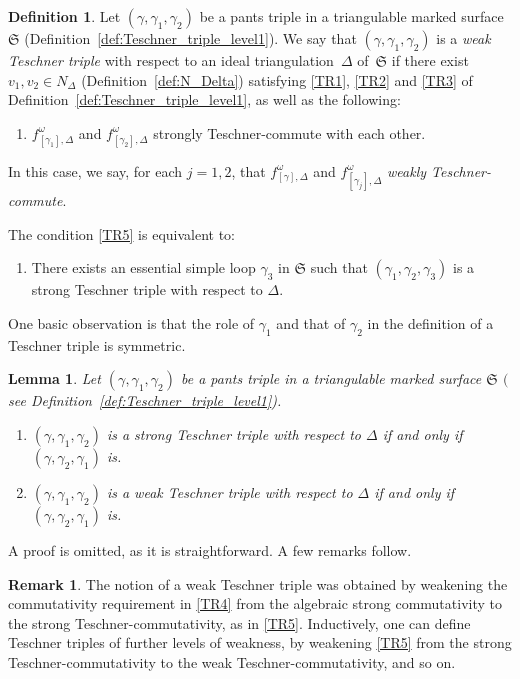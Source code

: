 \documentclass[pdftex]{sigma}
\numberwithin{equation}{section}
\newtheorem{Lemma}[Theorem]{Lemma}
\theoremstyle{definition}
\newtheorem{Definition}[Theorem]{Definition}
\newtheorem{Remark}[Theorem]{Remark}
\begin{document}
\begin{Definition}
\label{def:Teschner_triple_level2}
Let $(\gamma,\gamma_1,\gamma_2)$ be a pants triple in a triangulable marked surface $\mathfrak{S}$ (Definition~\ref{def:Teschner_triple_level1}). We say that $(\gamma,\gamma_1,\gamma_2)$ is a {\em weak Teschner triple} with respect to an ideal triangulation~$\Delta$ of~$\mathfrak{S}$ if there exist $v_1, v_2 \in N_\Delta$ (Definition~\ref{def:N_Delta}) satisfying \ref{TR1}, \ref{TR2} and \ref{TR3} of Definition~\ref{def:Teschner_triple_level1}, as well as the following:
\begin{enumerate}[label={\rm (TR\arabic*)}]\itemsep=0pt\setlength{\leftskip}{0.28cm}
\setcounter{enumi}{4}
\item\label{TR5} $f^\omega_{[\gamma_1],\Delta}$ and $f^\omega_{[\gamma_2],\Delta}$ strongly Teschner-commute with each other.
\end{enumerate}
In this case, we say, for each $j=1,2$, that $f^\omega_{[\gamma],\Delta}$ and $f^\omega_{[\gamma_j],\Delta}$ {\em weakly Teschner-commute}.
\end{Definition}
The condition \ref{TR5} is equivalent to:
\begin{enumerate}[label={\rm (TR\arabic*$'$)}]\itemsep=0pt\setlength{\leftskip}{0.38cm}
\setcounter{enumi}{4}
\item\label{TR5_prime} There exists an essential simple loop $\gamma_3$ in $\mathfrak{S}$ such that $(\gamma_1,\gamma_2,\gamma_3)$ is a strong Teschner triple with respect to $\Delta$.
\end{enumerate}
One basic observation is that the role of $\gamma_1$ and that of $\gamma_2$ in the definition of a Teschner triple is symmetric.
\begin{Lemma}
Let $(\gamma,\gamma_1,\gamma_2)$ be a pants triple in a triangulable marked surface $\mathfrak{S}$ $($see Definition~{\rm \ref{def:Teschner_triple_level1})}.
\begin{enumerate}\itemsep=0pt
\item[$(1)$] $(\gamma,\gamma_1,\gamma_2)$ is a strong Teschner triple with respect to $\Delta$ if and only if $(\gamma,\gamma_2,\gamma_1)$ is.
\item[$(2)$] $(\gamma,\gamma_1,\gamma_2)$ is a weak Teschner triple with respect to $\Delta$ if and only if $(\gamma,\gamma_2,\gamma_1)$ is.
\end{enumerate}
\end{Lemma}
A proof is omitted, as it is straightforward.
A few remarks follow.
\begin{Remark}\label{rem:further_weakness}
The notion of a weak Teschner triple was obtained by weakening the commutativity requirement in \ref{TR4} from the algebraic strong commutativity to the strong Teschner-commutativity, as in \ref{TR5}. Inductively, one can define Teschner triples of further levels of weakness, by weakening \ref{TR5} from the strong Teschner-commutativity to the weak Teschner-commutativity, and so on.
\end{Remark}
\end{document}
